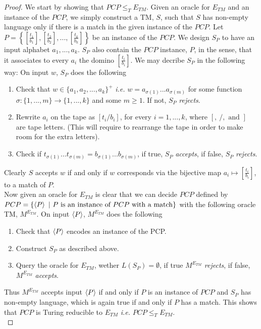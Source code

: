 \documentclass[a4paper,11pt]{article}
\newcommand{\ie}{\emph{i.e.} }
\numberwithin{equation}{section}
\begin{document}
\begin{proof}
	We start by showing that $ PCP\leq_T E_{TM} $. Given an oracle for $ E_{TM} $ and an instance of the $ PCP $, we simply construct a TM, $ S $, such that $ S $ has non-empty language only if there is a match in the given instance of the $ PCP $. Let $ P= \left\{\left[\frac{t_1}{b_1}\right],\left[\frac{t_2}{b_2}\right],...,\left[\frac{t_k}{b_k}\right]\right\} $ be an instance of the $ PCP $. We design $ S_P $ to have an input alphabet $ a_1,...,a_k $. $ S_P $ also contain the $ PCP $ instance, $ P $, in the sense, that it associates to every $ a_i $ the domino $ \left[\frac{t_i}{b_i}\right] $. We may decribe $ S_P $ in the following way: On input $ w $, $ S_P $ does the following\begin{enumerate}
		\item Check that $ w\in \{a_1,a_2,...,a_k\}^+ $ \ie $ w=a_{\sigma(1)}...a_{\sigma(m)} $ for some function $ \sigma:\{1,...,m\} \to\{1,...,k\} $ and some $ m\geq 1 $. If not, $ S_P $ \emph{rejects}.
		\item Rewrite $ a_i $ on the tape as $ \left[t_i/b_i\right] $, for every $ i=1,...,k $, where $ [,\ /,\text{ and } ] $ are tape letters. (This will require to rearrange the tape in order to make room for the extra letters).
		\item Check if $ t_{\sigma(1)}...t_{\sigma(m)}=b_{\sigma(1)}...b_{\sigma(m)} $, if true, $ S_P $ \emph{accepts}, if false, $ S_P $ \emph{rejects}.
	\end{enumerate}
Clearly $ S $ accepts $ w $ if and only if $ w $ corresponds via the bijective map $ a_i\mapsto \left[\frac{t_i}{b_i}\right] $, to a match of $ P $.\\
Now given an oracle for $ E_{TM} $ is clear that we can decide $ PCP $ defined by\\ $ PCP=\{\braket{P} \ \vert\  P\text{ is an instance of }PCP\text{ with a match}\} $ with the following oracle TM, $ M^{E_{TM}} $.
On input $ \braket{P} $, $ M^{E_{TM}} $ does the following \begin{enumerate}
	\item Check that $ \braket{P} $ encodes an instance of the PCP.
	\item Construct $ S_P $ as described above.
	\item Query the oracle for $ E_{TM} $, wether $ L(S_P)=\emptyset $, if true $ M^{E_{TM}} $ \emph{rejects}, if false, $ M^{E_{TM}} $ \emph{accepts}.
\end{enumerate} 
Thus $ M^{E_{TM}} $ accepts input $ \braket{P} $ if and only if $ P $ is an instance of $ PCP $ and $ S_P $ has non-empty language, which is again true if and only if $ P $ has a match. This shows that $ PCP $ is Turing reducible to $ E_{TM} $ \ie $ PCP\leq_T E_{TM} $. \\

\end{proof}
\end{document}
